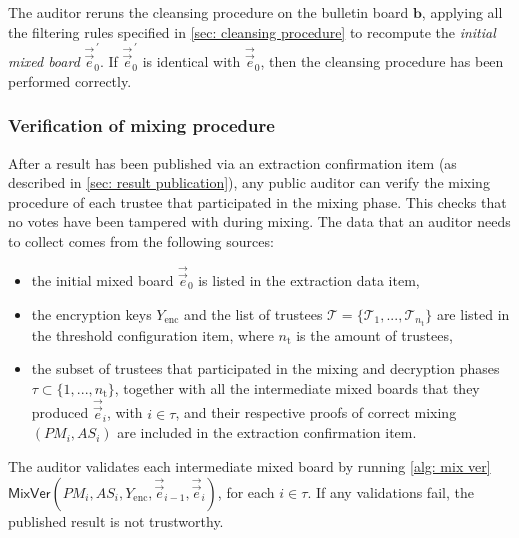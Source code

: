 The auditor reruns the cleansing procedure on the bulletin board $\boldsymbol{b}$, applying all the filtering rules specified in \cref{sec: cleansing procedure} to recompute the \textit{initial mixed board} $\vec{\vec{e}}_0^{\, \prime}$. If $\vec{\vec{e}}_0^{\, \prime}$ is identical with $\vec{\vec{e}}_0$, then the cleansing procedure has been performed correctly.


\subsubsection{Verification of mixing procedure} \label{sec: verification of mixing procedure}
After a result has been published via an extraction confirmation item (as described in \cref{sec: result publication}), any public auditor can verify the mixing procedure of each trustee that participated in the mixing phase. This checks that no votes have been tampered with during mixing. The data that an auditor needs to collect comes from the following sources:
\begin{itemize}
    \item the initial mixed board $\vec{\vec{e}}_0$ is listed in the extraction data item,
    \item the encryption keys $Y_\mathrm{enc}$ and the list of trustees $\boldsymbol{\mathcal{T}} = \{ \mathcal{T}_1, ..., \mathcal{T}_{n_\mathrm{t}} \}$ are listed in the threshold configuration item, where $n_\mathrm{t}$ is the amount of trustees,
    \item the subset of trustees that participated in the mixing and decryption phases $\tau \subset \{ 1, ..., n_\mathrm{t} \}$, together with all the intermediate mixed boards that they produced $\vec{\vec{e}}_i$, with $i \in \tau$, and their respective proofs of correct mixing $(PM_i, AS_i)$ are included in the extraction confirmation item.
\end{itemize}

The auditor validates each intermediate mixed board by running \cref{alg: mix ver} $\mathsf{MixVer} (PM_i, AS_i, Y_\mathrm{enc}, \vec{\vec{e}}_{i-1}, \vec{\vec{e}}_i)$, for each $i \in \tau$. If any validations fail, the published result is not trustworthy.


